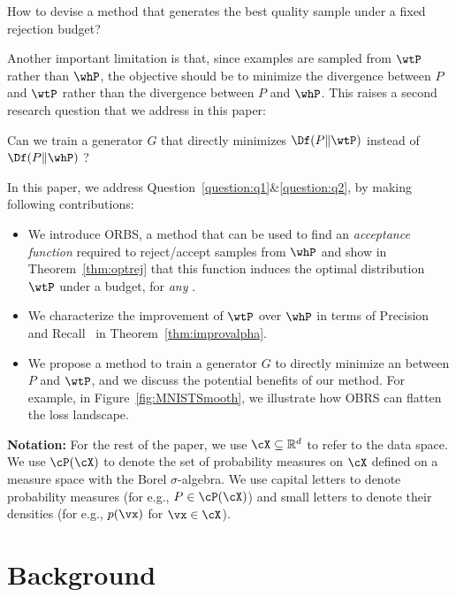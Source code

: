 \documentclass[twoside]{article}
\begin{document}
\begin{question}\label{question:q1}
    How to devise a method that generates the best quality sample under a fixed rejection budget?  
\end{question}

Another important limitation is that, since examples are sampled from $\wtP$ rather than $\whP$, the objective should be to minimize the divergence between $P$ and $\wtP$ rather than the divergence between $P$ and $\whP$. This raises a  second research question that we address in this paper:



\begin{question}\label{question:q2}
    Can we train a generator $G$ that directly minimizes $\Df(P\Vert \wtP)$ instead of $\Df(P\Vert \whP)$ ?
\end{question}

In this paper, we address Question~\ref{question:q1}\&\ref{question:q2}, by making following contributions:
\begin{itemize}
    \item    
    We introduce ORBS, a method that can be used to find an  {\em acceptance function} required to reject/accept samples from $\whP$ and show in Theorem~\ref{thm:optrej} that this function induces the optimal distribution $\wtP$ under a budget, for \emph{any} \fdiv. 
    \item We characterize the improvement of $\wtP$ over $\whP$ in terms of Precision and Recall~\citep{sajjadi_assessing_2018} in Theorem~\ref{thm:improvalpha}.
    \item We propose a method to train a generator $G$ to directly minimize an \fdiv between $P$ and $\wtP$, and we discuss the potential benefits of our method. For example, in Figure~\ref{fig:MNISTSmooth}, we illustrate how OBRS can flatten the loss landscape.    
\end{itemize}

\textbf{Notation: } For the rest of the paper, we use $\cX\subseteq \mathbb R^d$ to refer to the data space. We use $\cP(\cX)$ to denote the set of probability measures on $\cX$ defined on a measure space with the Borel $\sigma$-algebra. We use capital letters to denote probability measures (for e.g., $P\in \cP(\cX)$) and small letters to denote their densities (for e.g., $p(\vx)$ for $\vx\in \cX$).

\section{Background}
\end{document}
